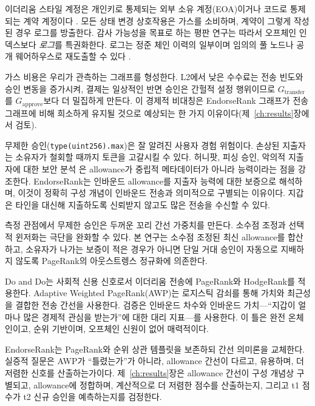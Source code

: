 이더리움 스타일 계정은 개인키로 통제되는 외부 소유 계정(EOA)이거나 코드로 통제되는 계약 계정이다 . 모든 상태 변경 상호작용은 가스를 소비하며, 계약이 그렇게 작성된 경우 로그를 방출한다. 감사 가능성을 목표로 하는 평판 연구는 따라서 오프체인 인덱스보다 \emph{로그}를 특권화한다. 로그는 정준 체인 이력의 일부이며 임의의 풀 노드나 공개 웨어하우스로 재도출할 수 있다 .

가스 비용은 우리가 관측하는 그래프를 형성한다. L2에서 낮은 수수료는 전송 빈도와 승인 변동을 증가시켜, 결제는 일상적인 반면 승인은 간헐적 설정 행위이므로 $G_{\text{transfer}}$를 $G_{\text{approve}}$보다 더 밀집하게 만든다. 이 경제적 비대칭은 EndorseRank 그래프가 전송 그래프에 비해 희소하게 유지될 것으로 예상되는 한 가지 이유이다(제~\ref{ch:results}장에서 검토).


무제한 승인(\texttt{type(uint256).max})은 잘 알려진 사용자 경험 위험이다. 손상된 지출자는 소유자가 철회할 때까지 토큰을 고갈시킬 수 있다. 허니팟, 피싱 승인, 악의적 지출자에 대한 보안 분석 은 allowance가 중립적 메타데이터가 아니라 능력이라는 점을 강조한다. EndorseRank는 인바운드 allowance를 지출자 능력에 대한 보증으로 해석하며, 이것이 정확히 구성 개념이 인바운드 전송과 의미적으로 구별되는 이유이다. 지갑은 타인을 대신해 지출하도록 신뢰받지 않고도 많은 전송을 수신할 수 있다.

측정 관점에서 무제한 승인은 두꺼운 꼬리 간선 가중치를 만든다. 소수점 조정과 선택적 윈저화는 극단을 완화할 수 있다. 본 연구는 소수점 조정된 최신 allowance를 합산하고, 소유자가 나가는 보증이 적은 경우가 아니면 단일 거대 승인이 자동으로 지배하지 않도록 PageRank의 아웃스트렝스 정규화에 의존한다.


Do and Do는 사회적 신용 신호로서 이더리움 전송에 PageRank와 HodgeRank를 적용한다. Adaptive Weighted PageRank(AWP)는 로지스틱 감쇠를 통해 가치와 최근성을 결합한 전송 간선을 사용한다. 검증은 인바운드 차수와 인바운드 가치---``지갑이 얼마나 많은 경제적 관심을 받는가''에 대한 대리 지표---를 사용한다. 이 틀은 완전 온체인이고, 순위 기반이며, 오프체인 신원이 없어 매력적이다.

EndorseRank는 PageRank와 순위 상관 템플릿을 보존하되 간선 의미론을 교체한다. 실증적 질문은 AWP가 ``틀렸는가''가 아니라, allowance 간선이 다르고, 유용하며, 더 저렴한 신호를 산출하는가이다. 제~\ref{ch:results}장은 allowance 간선이 구성 개념상 구별되고, allowance에 정합하며, 계산적으로 더 저렴한 점수를 산출하는지, 그리고 t1 점수가 t2 신규 승인을 예측하는지를 검정한다.

